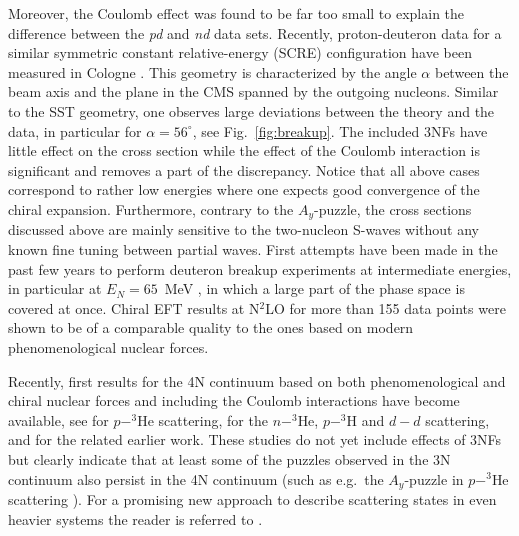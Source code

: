 \documentclass[aps,rmp,nofootinbib,twocolumn,floatfix]{revtex4}
\begin{document}
Moreover, the Coulomb effect was 
found to be far too small to explain the difference between the {\it pd} 
and {\it nd} data sets. Recently, proton-deuteron data for a similar symmetric 
constant relative-energy (SCRE) configuration have been measured in
Cologne \cite{Ley:2006hu}. This geometry is characterized by the angle $\alpha$
between the beam axis and the plane in the CMS spanned by the 
outgoing nucleons. Similar to the SST
geometry, one observes large deviations between the theory and the data, in
particular for $\alpha = 56^\circ$, see Fig.~\ref{fig:breakup}. The included
3NFs have 
little effect on the cross section while the effect of the Coulomb interaction 
is significant and removes a part of the discrepancy. Notice that all above
cases correspond to rather 
low energies where one expects good convergence of the chiral
expansion. Furthermore, contrary to the $A_y$-puzzle, the cross sections
discussed above are mainly sensitive to the two-nucleon S-waves without any 
known fine tuning between partial waves. 
First attempts have been made in the past few years to perform deuteron breakup
experiments at intermediate energies, in particular at $E_{N}=65$~MeV \cite{Kistryn:2005fi}, 
in which a large part of the phase space is covered at once. Chiral EFT
results at N$^2$LO for more than 155 data points were shown to be of a comparable 
quality to the ones based on modern phenomenological nuclear forces. 

Recently, first results for the 4N continuum based on both phenomenological and
chiral nuclear forces and including the Coulomb interactions have become
available, see \cite{Fisher:2006pm,Deltuva:2007xv} for $p -  ^3$He
scattering, \cite{Deltuva:2007xw} for the $n - ^3$He,  $p - ^3$H and $d-d$
scattering, and \cite{Lazauskas:2004uq} for the related earlier work. These
studies do not yet 
include effects of 3NFs but clearly indicate that at least 
some of the puzzles observed in the 3N continuum also persist in the 4N
continuum  (such
as e.g.~the $A_y$-puzzle in $p - ^3$He scattering \cite{Deltuva:2007xv}).  
For a promising new approach to describe scattering states in even heavier
systems the reader is referred to \cite{Quaglioni:2008sm}. 
\end{document}
